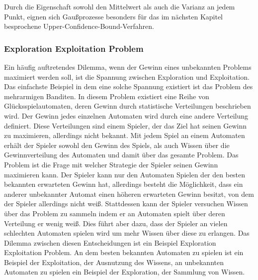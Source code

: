 %





Durch die Eigenschaft sowohl den Mittelwert als auch die Varianz an jedem Punkt, eignen sich Gaußprozesse besonders für das im nächsten Kapitel besprochene Upper-Confidence-Bound-Verfahren.

\subsubsection{Exploration Exploitation Problem}
\label{sub:exploration_exploitation}
Ein häufig auftretendes Dilemma, wenn der Gewinn eines unbekannten Problems maximiert werden soll, ist die Spannung zwischen Exploration und Exploitation.
Das einfachste Beispiel in dem eine solche Spannung existiert ist das Problem des mehrarmigen Banditen.
In diesem Problem existiert eine Reihe von Glücksspielautomaten, deren Gewinn durch statistische Verteilungen beschrieben wird.
Der Gewinn jedes einzelnen Automaten wird durch eine andere Verteilung definiert.
Diese Verteilungen sind einem Spieler, der das Ziel hat seinen Gewinn zu maximieren, allerdings nicht bekannt.
Mit jedem Spiel an einem Automaten erhält der Spieler sowohl den Gewinn des Spiels, als auch Wissen über die Gewinnverteilung des Automaten und damit über das gesamte Problem.
Das Problem ist die Frage mit welcher Strategie der Spieler seinen Gewinn maximieren kann.
Der Spieler kann nur den Automaten Spielen der den besten bekannten erwarteten Gewinn hat, allerdings besteht die Möglichkeit, dass ein anderer unbekannter Automat einen höheren erwarteten Gewinn besitzt, von dem der Spieler allerdings nicht weiß.
Stattdessen kann der Spieler versuchen Wissen über das Problem zu sammeln indem er an Automaten spielt über deren Verteilung er wenig weiß. 
Dies führt aber dazu, dass der Spieler an vielen schlechten Automaten spielen wird um mehr Wissen über diese zu erlangen.
Das Dilemma zwischen diesen Entscheidungen ist ein Beispiel Exploration Exploitation Problem.
An dem besten bekannten Automaten zu spielen ist ein Beispiel der Exploitation, der Ausnutzung des Wissens, an unbekannten Automaten zu spielen ein Beispiel der Exploration, der Sammlung von Wissen.

